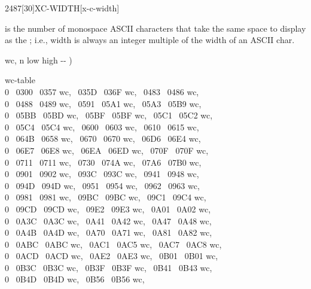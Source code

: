 \newpage
\begin{worddef}{2487}[30]{XC-WIDTH}[x-c-width]
\item {}

	 is the number of monospace ASCII characters that take the same
	space to display as the ; i.e.,  width is always
	an integer multiple of the width of an ASCII char.

	\begin{implement}
	\word{:} wc,  n low high -{}- )   \word{,} \word{,} \word{,} \word{;}

	 wc-table   \\
	0 ~0300 ~0357 wc, ~035D ~036F wc, ~0483 ~0486 wc,\\
	0 ~0488 ~0489 wc, ~0591 ~05A1 wc, ~05A3 ~05B9 wc,\\
	0 ~05BB ~05BD wc, ~05BF ~05BF wc, ~05C1 ~05C2 wc,\\
	0 ~05C4 ~05C4 wc, ~0600 ~0603 wc, ~0610 ~0615 wc,\\
	0 ~064B ~0658 wc, ~0670 ~0670 wc, ~06D6 ~06E4 wc,\\
	0 ~06E7 ~06E8 wc, ~06EA ~06ED wc, ~070F ~070F wc,\\
	0 ~0711 ~0711 wc, ~0730 ~074A wc, ~07A6 ~07B0 wc,\\
	0 ~0901 ~0902 wc, ~093C ~093C wc, ~0941 ~0948 wc,\\
	0 ~094D ~094D wc, ~0951 ~0954 wc, ~0962 ~0963 wc,\\
	0 ~0981 ~0981 wc, ~09BC ~09BC wc, ~09C1 ~09C4 wc,\\
	0 ~09CD ~09CD wc, ~09E2 ~09E3 wc, ~0A01 ~0A02 wc,\\
	0 ~0A3C ~0A3C wc, ~0A41 ~0A42 wc, ~0A47 ~0A48 wc,\\
	0 ~0A4B ~0A4D wc, ~0A70 ~0A71 wc, ~0A81 ~0A82 wc,\\
	0 ~0ABC ~0ABC wc, ~0AC1 ~0AC5 wc, ~0AC7 ~0AC8 wc,\\
	0 ~0ACD ~0ACD wc, ~0AE2 ~0AE3 wc, ~0B01 ~0B01 wc,\\
	0 ~0B3C ~0B3C wc, ~0B3F ~0B3F wc, ~0B41 ~0B43 wc,\\
	0 ~0B4D ~0B4D wc, ~0B56 ~0B56 wc,\tab[2]

\end{implement}
\end{worddef}
